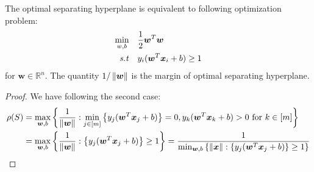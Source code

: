 \begin{proposition}
    The optimal separating hyperplane is equivalent to following optimization problem:
    \begin{equation*}
        \begin{aligned}
        \min_{w,b} \quad & \frac{1}{2}\boldsymbol w^{T}\boldsymbol w \\
        \text{\emph{s.t}} \quad & y_{i}(\boldsymbol w^T\boldsymbol x_i + b)\ge1\\
        \end{aligned}
    \end{equation*}
    for $\boldsymbol w \in \mathbb{R}^n$. The quantity $1/\left\lVert\boldsymbol w\right\rVert$ is the margin of optimal separating hyperplane.
\end{proposition}
\begin{proof}
    We have following the second case:
    \begin{equation*}
    \begin{aligned}
        \rho(S) &= 
        \max_{\boldsymbol w, b}\left\{ \frac{1}{\left\lVert\boldsymbol w\right\rVert} : \min_{j\in[m]}\left\{ y_j (\boldsymbol w^T\boldsymbol x_j + b) \right\} = 0, y_k(\boldsymbol w^T\boldsymbol x_k + b)>0 \text{ for } k \in [m] \right\} \\
        &= \max_{\boldsymbol w, b}\left\{ \frac{1}{\left\lVert\boldsymbol w\right\rVert} : \left\{ y_j (\boldsymbol w^T\boldsymbol x_j + b) \right\} \ge 1 \right\} = \frac{1}{\min_{\boldsymbol w, b}\left\{ \left\lVert\boldsymbol x\right\rVert : \left\{ y_j (\boldsymbol w^T\boldsymbol x_j + b) \right\} \ge 1 \right\}} \\
    \end{aligned}
    \end{equation*}
\end{proof}

